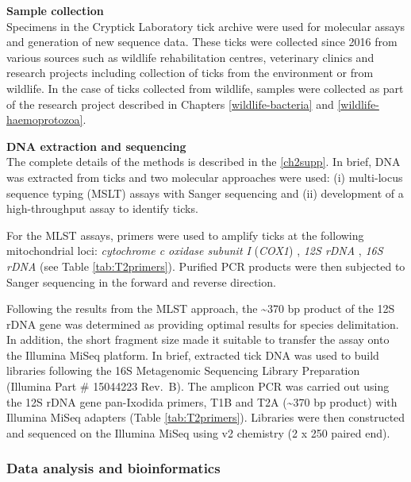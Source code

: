 \documentclass[a4paper, nobind]{templates/ociamthesis}
\begin{document}
\textbf{Sample collection}\\
Specimens in the Cryptick Laboratory tick archive were used for molecular assays and generation of new sequence data.
These ticks were collected since 2016 from various sources such as wildlife rehabilitation centres, veterinary clinics and research projects including collection of ticks from the environment or from wildlife.
In the case of ticks collected from wildlife, samples were collected as part of the research project described in Chapters \ref{wildlife-bacteria} and \ref{wildlife-haemoprotozoa}.

\textbf{DNA extraction and sequencing}\\
The complete details of the methods is described in the \ref{ch2supp}.
In brief, DNA was extracted from ticks and two molecular approaches were used: (i) multi-locus sequence typing (MSLT) assays with Sanger sequencing and (ii) development of a high-throughput assay to identify ticks.

For the MLST assays, primers were used to amplify ticks at the following mitochondrial loci: \emph{cytochrome c oxidase subunit I} (\emph{COX1}) \autocite{songPhylogeneticPhylogeographicRelationships2011}, \emph{12S rDNA} \autocite{beatiAnalysisSystematicRelationships2001}, \emph{16S rDNA} \autocite{lvDevelopmentDNABarcoding2014} (see Table \ref{tab:T2primers}).
Purified PCR products were then subjected to Sanger sequencing in the forward and reverse direction.

Following the results from the MLST approach, the \textasciitilde370 bp product of the 12S rDNA gene was determined as providing optimal results for species delimitation.
In addition, the short fragment size made it suitable to transfer the assay onto the Illumina MiSeq platform.
In brief, extracted tick DNA was used to build libraries following the 16S Metagenomic Sequencing Library Preparation (Illumina Part \# 15044223 Rev.~B).
The amplicon PCR was carried out using the 12S rDNA gene pan-Ixodida primers, T1B and T2A \autocite{beatiAnalysisSystematicRelationships2001} (\textasciitilde370 bp product) with Illumina MiSeq adapters (Table \ref{tab:T2primers}).
Libraries were then constructed and sequenced on the Illumina MiSeq using v2 chemistry (2 x 250 paired end).

\hypertarget{data-analysis-and-bioinformatics}{%
\subsubsection{Data analysis and bioinformatics}\label{data-analysis-and-bioinformatics}}
\end{document}
